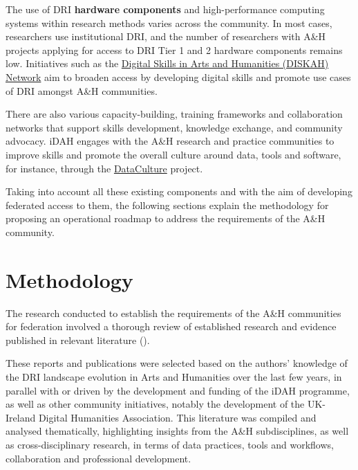 \documentclass[11pt]{scrartcl}
\begin{document}
The use of DRI \textbf{hardware components} and high-performance computing systems within research methods varies across the community. In most cases, researchers use institutional DRI, and the number of researchers with A\&H projects applying for access to DRI Tier 1 and 2 hardware components remains low. Initiatives such as the \href{https://www.diskah.org/}{Digital Skills in Arts and Humanities (DISKAH) Network} aim to broaden access by developing digital skills and promote use cases of DRI amongst A\&H communities.


There are also various capacity-building, training frameworks and collaboration networks that support skills development, knowledge exchange, and community advocacy. iDAH engages with the A\&H
research and practice communities to improve skills and promote the overall culture around data, tools and software, for instance, through the \href{https://www.turing.ac.uk/research/research-projects/dataculture-building-sustainable-communities-around-arts-and-humanities}{DataCulture} project.  

Taking into account all these existing components and with the aim of developing federated access to them, the following sections explain the methodology for proposing an operational roadmap to address the requirements of the A\&H community.

\section{Methodology}

The research conducted to establish the requirements of the A\&H
communities for federation involved a thorough review of established research and evidence published in relevant literature (\cite{beavan_2025a_15083396,beavan_2025b_15083632,bell_2025_17099176,Black19102024,connected,collier25,de_roure_2022_4716148,evans23,hawkins_2024_14006955,shoaib_sufi_2023_7686348,ross_2024_13710266,romanova_2021_5105938,Rodriguez22,wrro203045,Zwiggelaar22,taylor_2022_10518740,sichani_2023_8177926,McGillivray2020}). 

These reports and publications were selected based on the authors' knowledge of the DRI landscape evolution in Arts and Humanities over the last few years, in parallel with or driven by the development and funding of the iDAH programme, as well as other community initiatives, notably the development of the UK-Ireland Digital Humanities Association. This literature was compiled and analysed thematically, highlighting insights from the A\&H subdisciplines, as well as cross-disciplinary research, in terms of data practices, tools and workflows, collaboration and professional
development. 
\end{document}
